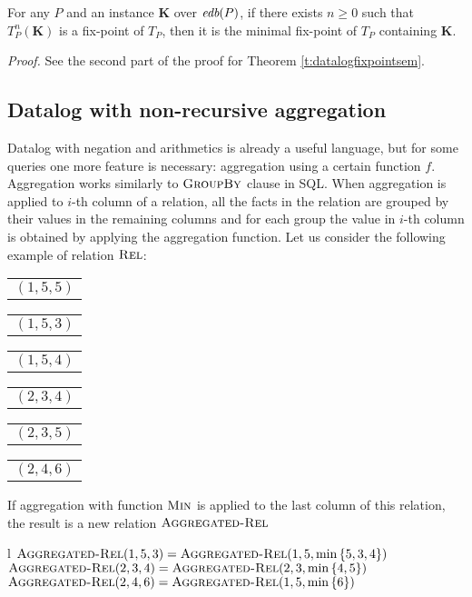 \begin{thm}
For any $P$ and an instance $\textbf{K}$ over $\textit{edb}(P)$, if there exists $n \ge 0$ such that $T_P^n(\textbf{K})$ is a fix-point of $T_P$, then it is the minimal fix-point of $T_P$ containing $\textbf{K}$.
\end{thm}
\emph{Proof.} See the second part of the proof for Theorem \ref{t:datalogfixpointsem}.

\subsection{Datalog with non-recursive aggregation}\label{ss:datalognra}

Datalog with negation and arithmetics is already a useful language, but for some queries one more feature is necessary: aggregation using a certain function $f$. Aggregation works similarly to $\textsc{GroupBy}$ clause in SQL. When aggregation is applied to $i$-th column of a relation, all the facts in the relation are grouped by their values in the remaining columns and for each group the value in $i$-th column is obtained by applying the aggregation function.
Let us consider the following example of relation $\textsc{Rel}$:

\begin{center}
\begin{tabular}{l}
  $(1, 5, 5)$
\end{tabular}
\quad
\begin{tabular}{l}
  $(1, 5, 3)$
\end{tabular}
\quad
\begin{tabular}{l}
  $(1, 5, 4)$
\end{tabular}
\quad
\begin{tabular}{l}
  $(2, 3, 4)$
\end{tabular}
\quad
\begin{tabular}{l}
  $(2, 3, 5)$
\end{tabular}
\quad
\begin{tabular}{l}
  $(2, 4, 6)$
\end{tabular}
\end{center}


If aggregation with function $\textsc{Min}$ is applied to the last column of this relation, the result is a new relation $\textsc{Aggregated-Rel}$

\begin{centab}{ l }
  $\textsc{Aggregated-Rel}(1, 5, 3) = \textsc{Aggregated-Rel}(1, 5, \min{\{5, 3, 4\}})$ \\
  $\textsc{Aggregated-Rel}(2, 3, 4) = \textsc{Aggregated-Rel}(2, 3, \min{\{4, 5\}})$ \\
  $\textsc{Aggregated-Rel}(2, 4, 6) = \textsc{Aggregated-Rel}(1, 5, \min{\{6\}})$ \\
\end{centab}

